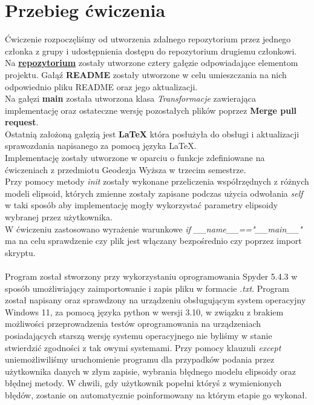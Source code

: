 \documentclass[a4paper,titleauthor]{mwart}
\begin{document}
    \section{Przebieg ćwiczenia}
    Ćwiczenie rozpoczęliśmy od utworzenia zdalnego repozytorium przez jednego członka z grupy i udostępnienia dostępu do repozytorium drugiemu członkowi.\\
    Na \textbf{\href{https://github.com/Grabarzd/Projekt1}{repozytorium}} zostały utworzone cztery gałęzie odpowiadające elementom projektu. Gałąź \textbf{README} zostały utworzone w celu umieszczania na nich odpowiednio pliku README oraz jego aktualizacji. \\
    Na gałęzi \textbf{main} została utworzona klasa \textit{Transformacje} 
    zawierająca implementację oraz ostateczne wersję pozostałych plików poprzez \textbf{Merge pull request}.\\
    Ostatnią założoną gałęzią jest \textbf{LaTeX} która posłużyła do obsługi i aktualizacji sprawozdania napisanego za pomocą języka LaTeX.\\
    Implementację zostały utworzone w oparciu o funkcje zdefiniowane na ćwiczeniach z przedmiotu Geodezja Wyższa w trzecim semestrze.\\
    Przy pomocy metody \textit{init} zostały wykonane przeliczenia współrzędnych z różnych modeli elipsoid, których zmienne zostały zapisane podczas użycia odwołania \textit{self} w taki sposób aby implementację mogły wykorzystać parametry elipsoidy wybranej przez użytkownika.\\
    W ćwiczeniu zastosowano wyrażenie warunkowe \textit{if \_\_name\_\_=="\_\_main\_\_"} ma na celu sprawdzenie czy plik jest włączany bezpośrednio czy poprzez import skryptu.
    \\\\
    Program został stworzony przy wykorzystaniu oprogramowania Spyder 5.4.3 w sposób umożliwiający zaimportowanie i zapis pliku w formacie \textit{.txt}.
    Program został napisany oraz sprawdzony na urządzeniu obsługującym system operacyjny Windows 11, za pomocą języka python w wersji 3.10, w związku z brakiem możliwości przeprowadzenia testów oprogramowania na urządzeniach posiadających starszą wersję systemu operacyjnego nie byliśmy w stanie stwierdzić zgodności z tak owymi systemami. Przy pomocy klauzuli \textit{except} uniemożliwiliśmy uruchomienie programu dla przypadków podania przez użytkownika danych w złym zapisie, wybrania błędnego modelu elipsoidy oraz błędnej metody. W chwili, gdy użytkownik popełni któryś z wymienionych błędów, zostanie on      automatycznie poinformowany na którym etapie go wykonał.
    
\end{document}
